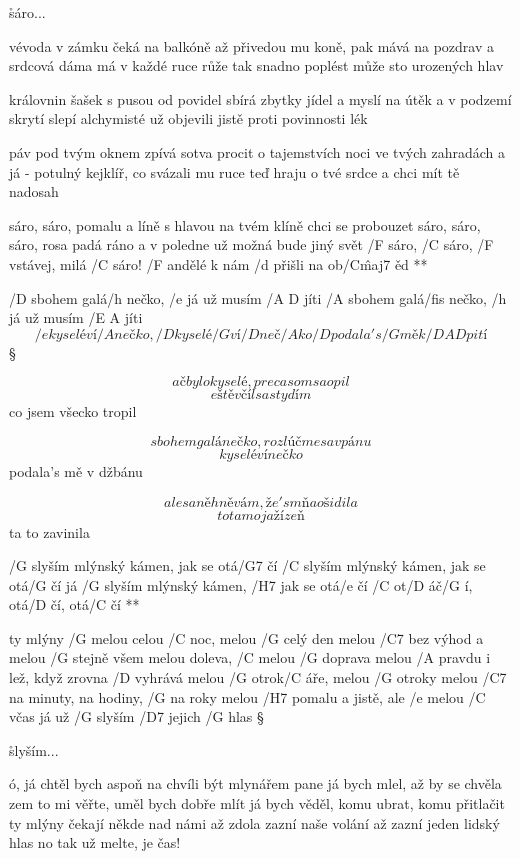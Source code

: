 \r sáro...

vévoda v zámku čeká na balkóně
až přivedou mu koně, pak mává na pozdrav
a srdcová dáma má v každé ruce růže
tak snadno poplést může sto urozených hlav

\rr

královnin šašek s pusou od povidel
sbírá zbytky jídel a myslí na útěk
a v podzemí skrytí slepí alchymisté
už objevili jistě proti povinnosti lék

\rr

páv pod tvým oknem zpívá sotva procit
o tajemstvích noci ve tvých zahradách
a já - potulný kejklíř, co svázali mu ruce
teď hraju o tvé srdce a chci mít tě nadosah

\R  sáro, sáro, pomalu a líně
    s hlavou na tvém klíně chci se probouzet
    sáro, sáro, sáro, rosa padá ráno
    a v poledne už možná bude jiný svět
    /F sáro, /C sáro, /F vstávej, milá /C sáro!
    /F andělé k nám /d přišli na ob/C\^{maj7} ěd **




/D sbohem galá/h nečko, /e já už musím /{A D} jíti
/A sbohem galá/fis nečko, /h já už musím /{E A} jíti
\[ /e kyselé ví/A nečko, /D kyselé /G ví/D neč/A ko
/D podala's /G mě k /{D A D} pití \]\S

\[ ač bylo kyselé, preca som sa opil \]
\[ eště včíl sa stydím \]
co jsem všecko tropil \s

\[ sbohem galánečko, rozlúčme sa v pánu \]
\[ kyselé vínečko \]
podala's mě v džbánu \s

\[ ale sa něhněvám, že's mňa ošidila \]
\[ to ta moja žízeň \]
ta to zavinila




\R /G slyším mlýnský kámen, jak se otá/G7 čí
   /C slyším mlýnský kámen, jak se otá/G čí
   já /G slyším mlýnský kámen, /H7 jak se otá/e čí
   /C ot/D áč/G í, otá/D čí, otá/C čí **

ty mlýny /G melou celou /C noc, melou /G celý den
melou /C7 bez výhod a melou /G stejně všem
melou doleva, /C melou /G doprava
melou /A pravdu i lež, když zrovna /D vyhrává
melou /G otrok/C áře, melou /G otroky
melou /C7 na minuty, na hodiny, /G na roky
melou /H7 pomalu a jistě, ale /e melou /C včas
já už /G slyším /D7 jejich /G hlas \S

\r slyším...

ó, já chtěl bych aspoň na chvíli být mlynářem
pane já bych mlel, až by se chvěla zem
to mi věřte, uměl bych dobře mlít
já bych věděl, komu ubrat, komu přitlačit
ty mlýny čekají někde nad námi
až zdola zazní naše volání
až zazní jeden lidský hlas
no tak už melte, je čas! \s

